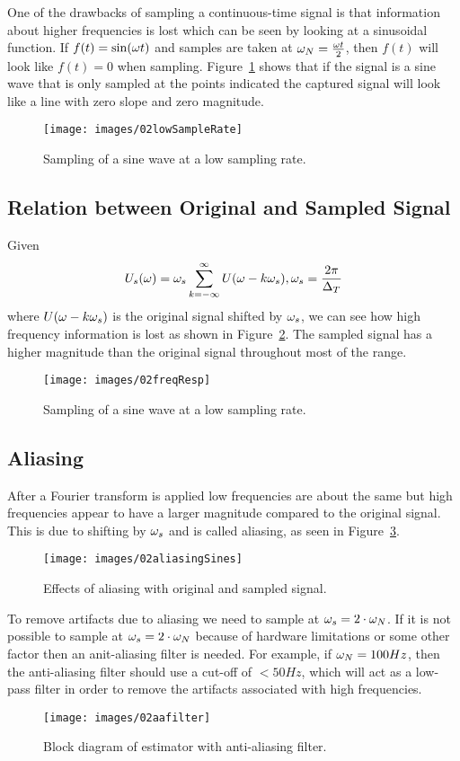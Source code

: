 One of the drawbacks of sampling a continuous-time signal is that information about higher frequencies is lost which can be seen by looking at a sinusoidal function.
If $f(t) = \sin(\omega t)$ and samples are taken at $\omega_N = \frac{\omega t}{2}$, then $f(t)$ will look like $f(t) = 0$ when sampling.
Figure~\ref{fig:02lowSampleRate} shows that if the signal is a sine wave that is only sampled at the points indicated the captured signal will look like a line with zero slope and zero magnitude.
\begin{figure}[ht!]
\centering
\texttt{[image: images/02lowSampleRate]}
\caption{Sampling of a sine wave at a low sampling rate.}
\label{fig:02lowSampleRate}
\end{figure}

\subsection{Relation between Original and Sampled Signal}
Given
$$U_s(\omega) = \omega_s \sum_{k=-\infty}^\infty U(\omega-k\omega_s), \omega_s = \frac{2\pi}{\Delta_T}$$
where $U(\omega-k\omega_s)$ is the original signal shifted by $\omega_s$, we can see how high frequency information is lost as shown in Figure~\ref{fig:02freqResp}.
The sampled signal has a higher magnitude than the original signal throughout most of the range.
\begin{figure}[ht!]
\centering
\texttt{[image: images/02freqResp]}
\caption{Sampling of a sine wave at a low sampling rate.}
\label{fig:02freqResp}
\end{figure}

\subsection{Aliasing}
After a Fourier transform is applied low frequencies are about the same but high frequencies appear to have a larger magnitude compared to the original signal.
This is due to shifting by $\omega_s$ and is called aliasing, as seen in Figure~\ref{fig:02aliasingSines}.
\begin{figure}[ht!]
\centering
\texttt{[image: images/02aliasingSines]}
\caption{Effects of aliasing with original and sampled signal.}
\label{fig:02aliasingSines}
\end{figure}

To remove artifacts due to aliasing we need to sample at $\omega_s = 2\cdot\omega_N$.
If it is not possible to sample at $\omega_s = 2\cdot\omega_N$ because of hardware limitations or some other factor then an anit-aliasing filter is needed.
For example, if $\omega_N = 100 Hz$, then the anti-aliasing filter should use a cut-off of $< 50 Hz$, which will act as a low-pass filter in order to remove the artifacts associated with high frequencies.
\begin{figure}[ht!]
\centering
\texttt{[image: images/02aafilter]}
\caption{Block diagram of estimator with anti-aliasing filter.}
\label{fig:02aafilter}
\end{figure}

